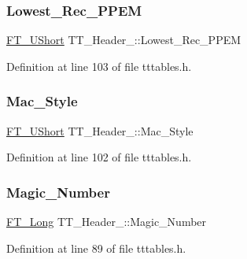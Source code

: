\mbox{\label{struct_t_t___header___a1d20801c3482dee2529d294441ed9af3}} 
\subsubsection{\texorpdfstring{Lowest\_Rec\_PPEM}{Lowest\_Rec\_PPEM}}
{\footnotesize\ttfamily \mbox{\hyperlink{fttypes_8h_a937f6c17cf5ffd09086d8610c37b9f58}{F\+T\+\_\+\+U\+Short}} T\+T\+\_\+\+Header\+\_\+\+::\+Lowest\+\_\+\+Rec\+\_\+\+P\+P\+EM}



Definition at line 103 of file tttables.\+h.

\mbox{\label{struct_t_t___header___a82f2a5a836b802e44ff712b3afc8745c}} 
\subsubsection{\texorpdfstring{Mac\_Style}{Mac\_Style}}
{\footnotesize\ttfamily \mbox{\hyperlink{fttypes_8h_a937f6c17cf5ffd09086d8610c37b9f58}{F\+T\+\_\+\+U\+Short}} T\+T\+\_\+\+Header\+\_\+\+::\+Mac\+\_\+\+Style}



Definition at line 102 of file tttables.\+h.

\mbox{\label{struct_t_t___header___a24e0dde7596c7303c8b8872feb1c221f}} 
\subsubsection{\texorpdfstring{Magic\_Number}{Magic\_Number}}
{\footnotesize\ttfamily \mbox{\hyperlink{fttypes_8h_a7fa72a1f0e79fb1860c5965789024d6f}{F\+T\+\_\+\+Long}} T\+T\+\_\+\+Header\+\_\+\+::\+Magic\+\_\+\+Number}



Definition at line 89 of file tttables.\+h.

\mbox{\label{struct_t_t___header___a48db8e244aee26da683240e67644619e}} 
